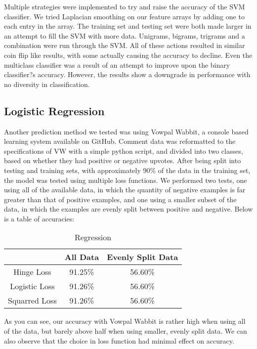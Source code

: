 \documentclass{article}
\begin{document}
Multiple strategies were implemented to try and raise the accuracy of the SVM classifier. We tried Laplacian smoothing on our feature arrays by adding one to each entry in the array. The training set and testing set were both made larger in an attempt to fill the SVM with more data. Unigrams, bigrams, trigrams and a combination were run through the SVM. All of these actions resulted in similar coin flip like results, with some actually causing the accuracy to decline. Even the multiclass classifier was a result of an attempt to improve upon the binary classifier?s accuracy. However, the results show a downgrade in performance with no diversity in classification.

\subsection{Logistic Regression}
Another prediction method we tested was using Vowpal Wabbit, a console based learning system available on GitHub. Comment data was reformatted to the specifications of VW with a simple python script, and divided into two classes, based on whether they had positive or negative upvotes. After being split into testing and training sets, with approximately 90\% of the data in the training set, the model was tested using multiple loss functions. We performed two tests, one using all of the available data, in which the quantity of negative examples is far greater than that of positive examples, and one using a smaller subset of the data, in which the examples are evenly split between positive and negative. Below is a table of accuracies:


\begin{table}[h]
\centering
\caption{Regression}
\begin{tabular}{|| c c c||}
\hline
& All Data & Evenly Split Data\\
\hline\hline
Hinge Loss & 91.25\% & 56.60\% \\
Logistic Loss & 91.26\% & 56.60\% \\
Squarred Loss & 91.26\% & 56.60\% \\
\hline
\end{tabular}
\end{table}

As you can see, our accuracy with Vowpal Wabbit is rather high when using all of the data, but barely above half when using smaller, evenly split data. We can also observe that the choice in loss function had minimal effect on accuracy.
\end{document}
